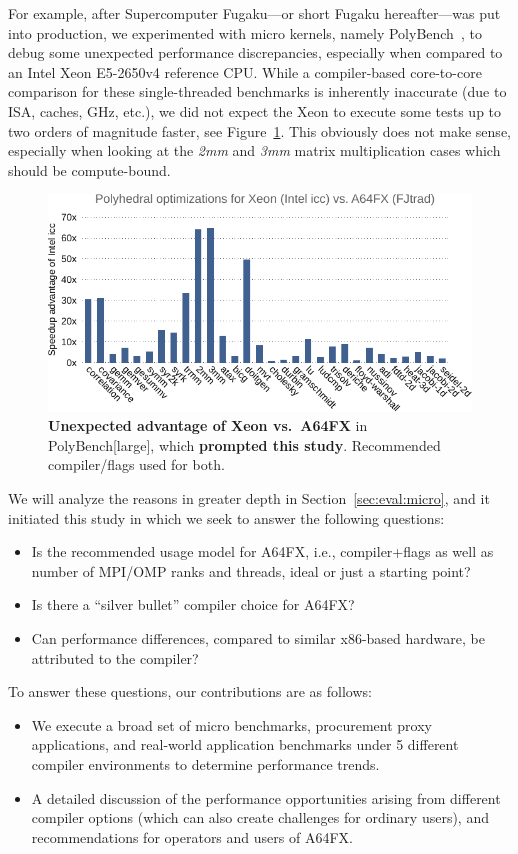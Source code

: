 \documentclass[conference,compsoc]{IEEEtran}
\begin{document}
For example, after Supercomputer Fugaku---or short Fugaku hereafter---was put into production, we
experimented with micro kernels, namely PolyBench~\cite{pouchet_polybenchc_2016}, to debug some unexpected performance
discrepancies, especially when compared to an Intel Xeon E5-2650v4 reference CPU. While a compiler-based core-to-core
comparison for these single-threaded benchmarks is inherently inaccurate (due to ISA, caches, GHz, etc.), we did not expect
the Xeon to execute some tests up to two orders of magnitude faster, see Figure~\ref{fig:demo_polly}.
This obviously does not make sense, especially when looking at the \textit{2mm} and \textit{3mm}
matrix multiplication cases which should be compute-bound.
%
\begin{figure}[tbp]
    \centering
    \includegraphics[width=0.96\linewidth]{demo_polly}
    \caption{\textbf{Unexpected advantage of Xeon vs.~A64FX} in PolyBench[large], which \textbf{prompted this study}.
    Recommended compiler/flags used for both.}
    \label{fig:demo_polly}
\end{figure}
%
We will analyze the reasons in greater depth in Section~\ref{sec:eval:micro}, and it initiated
this study in which we seek to answer the following questions:
\begin{itemize}
	\item Is the recommended usage model for A64FX, i.e., compiler+flags as well as number of MPI/OMP ranks
	and threads, ideal or just a starting point?
	\item Is there a ``silver bullet'' compiler choice for A64FX?
	\item Can performance differences, compared to similar x86-based hardware, be attributed to the compiler?
\end{itemize}
To answer these questions, our contributions are as follows:
\begin{itemize}
	\item We execute a broad set of micro benchmarks, procurement proxy applications, and real-world
	application benchmarks under 5 different compiler environments to determine performance trends.
	\item A detailed discussion of the performance opportunities arising from different compiler options
	(which can also create challenges for ordinary users), and recommendations for operators and users of A64FX.
\end{itemize}
\end{document}
